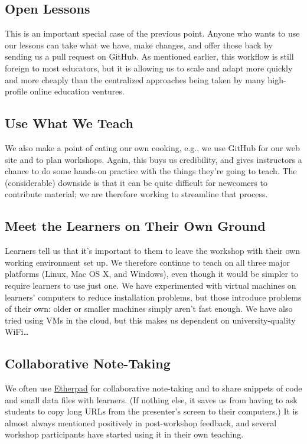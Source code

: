 \documentclass[10pt,a4paper,twocolumn]{article}
\begin{document}
\subsection*{Open Lessons}

This is an important special case of the previous point. Anyone who
wants to use our lessons can take what we have, make changes, and offer
those back by sending us a pull request on GitHub. As mentioned earlier,
this workflow is still foreign to most educators, but it is allowing us
to scale and adapt more quickly and more cheaply than the centralized
approaches being taken by many high-profile online education ventures.

\subsection*{Use What We Teach}

We also make a point of eating our own cooking, e.g., we use GitHub for
our web site and to plan workshops. Again, this buys us credibility,
and gives instructors a chance to do some hands-on practice with the
things they're going to teach. The (considerable) downside is that it
can be quite difficult for newcomers to contribute material; we are
therefore working to streamline that process.

\subsection*{Meet the Learners on Their Own Ground}

Learners tell us that it's important to them to leave the workshop
with their own working environment set up. We therefore continue to
teach on all three major platforms (Linux, Mac OS X, and Windows),
even though it would be simpler to require learners to use just
one. We have experimented with virtual machines on learners' computers
to reduce installation problems, but those introduce problems of their
own: older or smaller machines simply aren't fast enough.  We have
also tried using VMs in the cloud, but this makes us dependent on
university-quality WiFi\ldots{}

\subsection*{Collaborative Note-Taking}

We often use \href{http://etherpad.org}{Etherpad} for collaborative
note-taking and to share snippets of code and small data files with
learners. (If nothing else, it saves us from having to ask students to
copy long URLs from the presenter's screen to their computers.) It is
almost always mentioned positively in post-workshop feedback, and
several workshop participants have started using it in their own
teaching.
\end{document}
